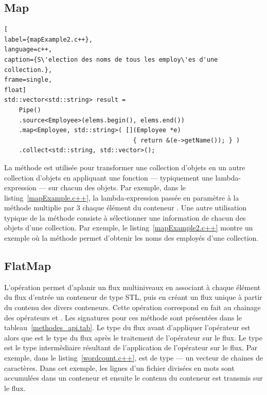 \subsection{Map}



\begin{lstlisting}[
label={mapExample2.c++},
language=c++,
caption={S\'election des noms de tous les employ\'es d'une collection.},
frame=single,
float]
std::vector<std::string> result =
    Pipe()
    .source<Employee>(elems.begin(), elems.end())
    .map<Employee, std::string>( [](Employee *e) 
                                   { return &(e->getName()); } )
    .collect<std::string, std::vector>();
\end{lstlisting}




La m\'ethode  est utilis\'ee pour transformer une collection d'objets en un autre collection d'objets en appliquant une fonction --- typiquement une lambda-expression --- sur chacun des objets. Par exemple, dans le listing~\ref{mapExample.c++}, la lambda-expression pass\'ee en param\`etre \`a la m\'ethode  multiplie par 3 chaque \'el\'ement du conteneur . Une autre utilisation typique de la méthode  consiste \`a s\'electionner une information de chacun des objets d'une collection. Par exemple, le listing~\ref{mapExample2.c++} montre un exemple o\`u la méthode  permet d'obtenir les noms des employ\'es d'une collection. 


\subsection{FlatMap}

L'op\'eration   permet d'aplanir un flux multiniveaux en associant \`a chaque \'el\'ement du flux d'entr\'ee un conteneur de type STL, puis en cr\'eant un flux unique \`a partir du contenu des divers conteneurs. Cette op\'eration correspond en fait au chainage des op\'erateurs  et . Les  signatures pour ces m\'ethode sont pr\'esent\'ees dans le tableau~\ref{methodes_api.tab}. Le type du flux avant d'appliquer l'op\'erateur  est  alors que  est le type du flux apr\`es le traitement de l'op\'erateur sur le flux. Le type  est le type interm\`ediaire r\'esultant de l'application de l'op\'erateur  sur le flux. Par exemple, dans le listing~\ref{wordcount.c++},  est de type  --- un vecteur de chaines de caract\`eres. Dans cet exemple, les lignes d'un fichier divis\'ees en mots sont accumul\'ees dans un conteneur et ensuite le contenu du conteneur est transmis sur le flux.


